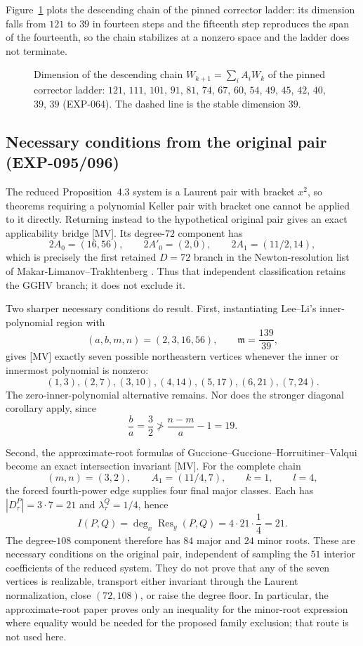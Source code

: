 \documentclass[11pt]{article}
\theoremstyle{remark}
\begin{document}
Figure~\ref{fig:chain} plots the descending chain of the pinned corrector ladder: its dimension falls from $121$ to $39$ in fourteen steps and the fifteenth step reproduces the span of the fourteenth, so the chain
stabilizes at a nonzero space and the ladder does not terminate.

\begin{figure}[t]
\centering

\caption{Dimension of the descending chain $W_{k+1}=\sum_iA_iW_k$ of the pinned corrector ladder: $121$, $111$, $101$, $91$, $81$, $74$, $67$, $60$, $54$, $49$, $45$, $42$, $40$, $39$, $39$ (EXP-064). The dashed line is the stable dimension $39$.}\label{fig:chain}
\end{figure}
\subsection{Necessary conditions from the original pair (EXP-095/096)}\label{sec:necessary}

The reduced Proposition~4.3 system is a Laurent pair with bracket $x^2$, so
theorems requiring a polynomial Keller pair with bracket one cannot be applied
to it directly. Returning instead to the hypothetical original pair gives an
exact applicability bridge [MV]. Its degree-$72$ component has
\[
  2A_0=(16,56),\qquad 2A'_0=(2,0),\qquad
  2A_1=(11/2,14),
\]
which is precisely the first retained $D=72$ branch in the Newton-resolution
list of Makar-Limanov--Trakhtenberg \cite{MakarLimanovTrakhtenberg2024}.
Thus that independent classification retains the GGHV branch; it does not
exclude it.

Two sharper necessary conditions do result. First, instantiating
Lee--Li's inner-polynomial region \cite{LeeLi2024} with
\[
 (a,b,m,n)=(2,3,16,56),\qquad \mathfrak m=\frac{139}{39},
\]
gives [MV] exactly seven possible northeastern vertices whenever the inner or
innermost polynomial is nonzero:
\[
 (1,3),(2,7),(3,10),(4,14),(5,17),(6,21),(7,24).
\]
The zero-inner-polynomial alternative remains. Nor does the stronger diagonal
corollary apply, since
\[
 \frac ba=\frac32\not>\frac{n-m}{a}-1=19.
\]

Second, the approximate-root formulas of
Guccione--Guccione--Horruitiner--Valqui \cite{GGHVApproxRoots} become an exact
intersection invariant [MV]. For the complete chain
\[
 (m,n)=(3,2),\qquad A_1=(11/4,7),\qquad k=1,\qquad l=4,
\]
the forced fourth-power edge supplies four final major classes. Each has
$|D_\tau^P|=3\cdot7=21$ and $\lambda_\tau^Q=1/4$, hence
\[
 I(P,Q)=\deg_x\operatorname{Res}_y(P,Q)
       =4\cdot21\cdot\frac14=21.
\]
The degree-$108$ component therefore has $84$ major and $24$ minor roots.
These are necessary conditions on the original pair, independent of sampling the
$51$ interior coefficients of the reduced system. They do not prove that any of
the seven vertices is realizable, transport either invariant through the
Laurent normalization, close $(72,108)$, or raise the degree floor. In
particular, the approximate-root paper proves only an inequality for the
minor-root expression where equality would be needed for the proposed family
exclusion; that route is not used here.
\end{document}
